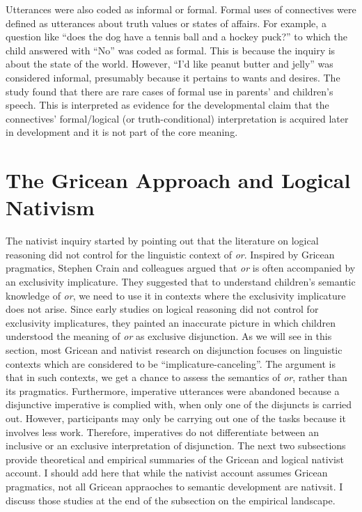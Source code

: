 \documentclass[oneside]{report}
\theoremstyle{definition}
\theoremstyle{definition}
\theoremstyle{definition}
\theoremstyle{remark}
\begin{document}
Utterances were also coded as informal or formal. Formal uses of
connectives were defined as utterances about truth values or states of
affairs. For example, a question like ``does the dog have a tennis ball
and a hockey puck?'' to which the child answered with ``No'' was coded
as formal. This is because the inquiry is about the state of the world.
However, ``I'd like peanut butter and jelly'' was considered informal,
presumably because it pertains to wants and desires. The study found
that there are rare cases of formal use in parents' and children's
speech. This is interpreted as evidence for the developmental claim that
the connectives' formal/logical (or truth-conditional) interpretation is
acquired later in development and it is not part of the core meaning.

\section{The Gricean Approach and Logical
Nativism}\label{the-gricean-approach-and-logical-nativism}

The nativist inquiry started by pointing out that the literature on
logical reasoning did not control for the linguistic context of
\emph{or}. Inspired by Gricean pragmatics, Stephen Crain and colleagues
argued that \emph{or} is often accompanied by an exclusivity
implicature. They suggested that to understand children's semantic
knowledge of \emph{or}, we need to use it in contexts where the
exclusivity implicature does not arise. Since early studies on logical
reasoning did not control for exclusivity implicatures, they painted an
inaccurate picture in which children understood the meaning of \emph{or}
as exclusive disjunction. As we will see in this section, most Gricean
and nativist research on disjunction focuses on linguistic contexts
which are considered to be ``implicature-canceling''. The argument is
that in such contexts, we get a chance to assess the semantics of
\emph{or}, rather than its pragmatics. Furthermore, imperative
utterances were abandoned because a disjunctive imperative is complied
with, when only one of the disjuncts is carried out. However,
participants may only be carrying out one of the tasks because it
involves less work. Therefore, imperatives do not differentiate between
an inclusive or an exclusive interpretation of disjunction. The next two
subsections provide theoretical and empirical summaries of the Gricean
and logical nativist account. I should add here that while the nativist
account assumes Gricean pragmatics, not all Gricean appraoches to
semantic development are nativsit. I discuss those studies at the end of
the subsection on the empirical landscape.
\end{document}
